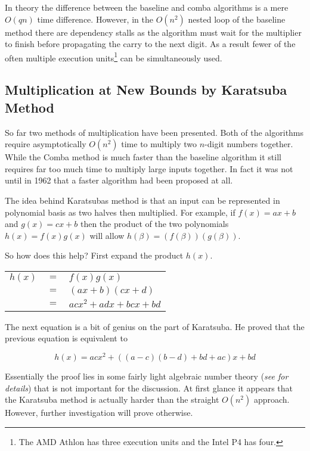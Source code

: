 \documentclass[b5paper]{book}
\begin{document}
In theory the difference between the baseline and comba algorithms is a mere $O(qn)$ time difference.  However, in the $O(n^2)$ nested loop of the
baseline method there are dependency stalls as the algorithm must wait for the multiplier to finish before propagating the carry to the next 
digit.  As a result fewer of the often multiple execution units\footnote{The AMD Athlon has three execution units and the Intel P4 has four.} can
be simultaneously used.  

\subsection{Multiplication at New Bounds by Karatsuba Method}
So far two methods of multiplication have been presented.  Both of the algorithms require asymptotically $O(n^2)$ time to multiply two $n$-digit 
numbers together.  While the Comba method is much faster than the baseline algorithm it still requires far too much time to multiply 
large inputs together.  In fact it was not until \cite{KARA} in 1962 that a faster algorithm had been proposed at all.

The idea behind Karatsubas method is that an input can be represented in polynomial basis as two halves then multiplied.  For example, if 
$f(x) = ax + b$ and $g(x) = cx + b$ then the product of the two polynomials $h(x) = f(x)g(x)$ will allow $h(\beta) = (f(\beta))(g(\beta))$.  

So how does this help?  First expand the product $h(x)$.

\begin{center}
\begin{tabular}{rcl}
$h(x)$ & $=$ & $f(x)g(x)$ \\
       & $=$ & $(ax + b)(cx + d)$ \\
       & $=$ & $acx^2 + adx + bcx + bd$ \\
\end{tabular}
\end{center}

The next equation is a bit of genius on the part of Karatsuba.  He proved that the previous equation is equivalent to 

\begin{equation}
h(x) = acx^2 + ((a - c)(b - d) + bd + ac)x + bd
\end{equation}

Essentially the proof lies in some fairly light algebraic number theory (\textit{see \cite{KARAP} for details}) that is not important for
the discussion.  At first glance it appears that the Karatsuba method is actually harder than the straight $O(n^2)$ approach.  
However, further investigation will prove otherwise.  
\end{document}
